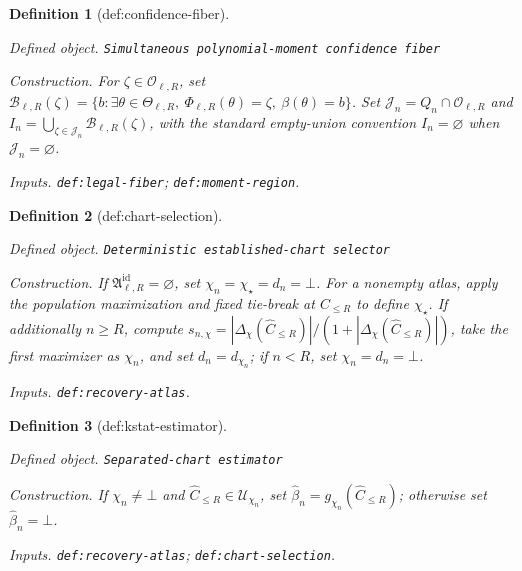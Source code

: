 \documentclass{article}
\newtheorem{definition}{Definition}
\begin{document}
\begin{definition}[def:confidence-fiber]\label{def:confidence-fiber}
\par\smallskip\noindent\emph{Defined object.} \texttt{Simultaneous polynomial-\allowbreak{}moment confidence fiber}
\par\smallskip\noindent\emph{Construction.} For \(\zeta\in\mathcal O_{\ell,R}\), set \(\mathcal B_{\ell,R}(\zeta)=\{b:\exists\theta\in\Theta_{\ell,R},\ \Phi_{\ell,R}(\theta)=\zeta,\ \beta(\theta)=b\}\). Set \(\mathcal J_n=Q_n\cap\mathcal O_{\ell,R}\) and \(I_n=\bigcup_{\zeta\in\mathcal J_n}\mathcal B_{\ell,R}(\zeta)\), with the standard empty-union convention \(I_n=\varnothing\) when \(\mathcal J_n=\varnothing\).
\par\smallskip\noindent\emph{Inputs.} \texttt{def:\allowbreak{}legal-\allowbreak{}fiber}; \texttt{def:\allowbreak{}moment-\allowbreak{}region}.
\end{definition}

\begin{definition}[def:chart-selection]\label{def:chart-selection}
\par\smallskip\noindent\emph{Defined object.} \texttt{Deterministic established-\allowbreak{}chart selector}
\par\smallskip\noindent\emph{Construction.} If \(\mathfrak A^{\mathrm{id}}_{\ell,R}=\varnothing\), set \(\chi_n=\chi_{\star}=d_n=\bot\). For a nonempty atlas, apply the population maximization and fixed tie-break at \(C_{\le R}\) to define \(\chi_{\star}\). If additionally \(n\ge R\), compute \(s_{n,\chi}=|\Delta_{\chi}(\widehat C_{\le R})|/(1+|\Delta_{\chi}(\widehat C_{\le R})|)\), take the first maximizer as \(\chi_n\), and set \(d_n=d_{\chi_n}\); if \(n<R\), set \(\chi_n=d_n=\bot\).
\par\smallskip\noindent\emph{Inputs.} \texttt{def:\allowbreak{}recovery-\allowbreak{}atlas}.
\end{definition}

\begin{definition}[def:kstat-estimator]\label{def:kstat-estimator}
\par\smallskip\noindent\emph{Defined object.} \texttt{Separated-\allowbreak{}chart estimator}
\par\smallskip\noindent\emph{Construction.} If \(\chi_n\ne\bot\) and \(\widehat C_{\le R}\in\mathcal U_{\chi_n}\), set \(\widehat\beta_n=g_{\chi_n}(\widehat C_{\le R})\); otherwise set \(\widehat\beta_n=\bot\).
\par\smallskip\noindent\emph{Inputs.} \texttt{def:\allowbreak{}recovery-\allowbreak{}atlas}; \texttt{def:\allowbreak{}chart-\allowbreak{}selection}.
\end{definition}
\end{document}
